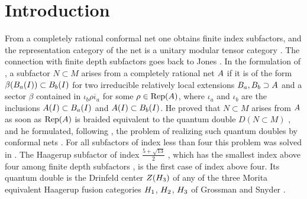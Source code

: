 \documentclass[leqno]{article}
\let\cal\relax
\newcommand{\cal}{\mathcal}
\newcommand{\ovl}{\overline}
\DeclareMathOperator{\Rep}{Rep} %
\numberwithin{equation}{section}
\begin{document}
\makeatletter
 \renewcommand{\@makefntext}[1]{#1}
 \makeatother

{
  \hypersetup{linkcolor=blue}
 \tableofcontents
}

\section{Introduction}
\label{sec:Introduction}

From a completely rational conformal net one obtains finite index subfactors, and the representation category of the net is a unitary modular tensor category \cite{KLM01}. The connection with finite depth subfactors goes back to Jones \cite[Section 1.3 p.~2]{Bro20}. In the formulation of \cite[Definition 4.1 p.~20]{Bis17a}, a subfactor $N \subset M$ arises from a completely rational net $\cal A$ if it is of the form $\beta(\cal B_a(I)) \subset \cal B_b(I)$ for two irreducible relatively local extensions $\cal B_a, \cal B_b \supset \cal A$ and a sector $\beta$ contained in $\iota_b\rho\ovl{\iota}_a$ for some $\rho \in \Rep(\cal A)$, where $\iota_a$ and $\iota_b$ are the inclusions $\cal A(I) \subset \cal B_a(I)$ and $\cal A(I) \subset \cal B_b(I)$. He proved that $N \subset M$ arises from $\cal A$ as soon as $\Rep(\cal A)$ is braided equivalent to the quantum double $D(N \subset M)$ \cite[Proposition 4.7 p.~22]{Bis17a}, and he formulated, following \cite{EvG11}, the problem of realizing such quantum doubles by conformal nets \cite[Problem 1.3 p.~16]{Bis17a}. For all subfactors of index less than four this problem was solved in \cite{Bis15}. The Haagerup subfactor of index $\frac{5+\sqrt{13}}{2}$ \cite{AsH99}, which has the smallest index above four among finite depth subfactors \cite[Section 4.2.1 p.~22]{JMS14}, is the first case of index above four. Its quantum double is the Drinfeld center $Z(\cal H_3)$ of any of the three Morita equivalent Haagerup fusion categories $\cal H_1$, $\cal H_2$, $\cal H_3$ of Grossman and Snyder \cite{GrS12}.
\end{document}
